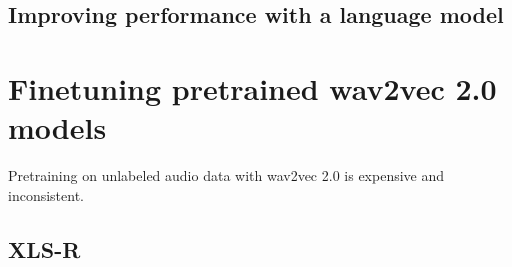 \subsection{Improving performance with a language model}



\section{Finetuning pretrained wav2vec 2.0 models}
Pretraining on unlabeled audio data with wav2vec 2.0 is expensive and inconsistent.



\subsection{XLS-R}
